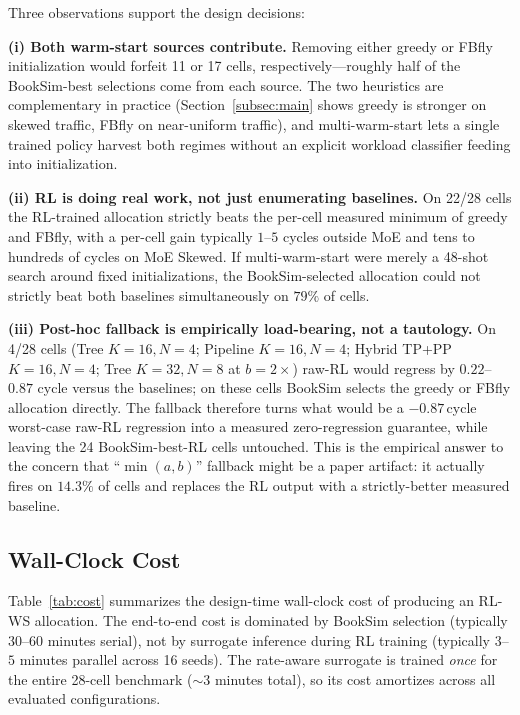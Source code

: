\documentclass[conference]{IEEEtran}
\begin{document}
Three observations support the design decisions:

\textbf{(i) Both warm-start sources contribute.} Removing either greedy or FBfly initialization would forfeit 11 or 17 cells, respectively---roughly half of the BookSim-best selections come from each source. The two heuristics are complementary in practice (Section~\ref{subsec:main} shows greedy is stronger on skewed traffic, FBfly on near-uniform traffic), and multi-warm-start lets a single trained policy harvest both regimes without an explicit workload classifier feeding into initialization.

\textbf{(ii) RL is doing real work, not just enumerating baselines.} On 22/28 cells the RL-trained allocation strictly beats the per-cell measured minimum of greedy and FBfly, with a per-cell gain typically $1$--$5$ cycles outside MoE and tens to hundreds of cycles on MoE Skewed. If multi-warm-start were merely a 48-shot search around fixed initializations, the BookSim-selected allocation could not strictly beat both baselines simultaneously on $79\%$ of cells.

\textbf{(iii) Post-hoc fallback is empirically load-bearing, not a tautology.} On 4/28 cells (Tree $K{=}16, N{=}4$; Pipeline $K{=}16, N{=}4$; Hybrid TP+PP $K{=}16, N{=}4$; Tree $K{=}32, N{=}8$ at $b{=}2\times$) raw-RL would regress by $0.22$--$0.87$ cycle versus the baselines; on these cells BookSim selects the greedy or FBfly allocation directly. The fallback therefore turns what would be a $-0.87$\,cycle worst-case raw-RL regression into a measured zero-regression guarantee, while leaving the 24 BookSim-best-RL cells untouched. This is the empirical answer to the concern that ``$\min(a,b)$'' fallback might be a paper artifact: it actually fires on $14.3\%$ of cells and replaces the RL output with a strictly-better measured baseline.

\subsection{Wall-Clock Cost}
\label{subsec:cost}

Table~\ref{tab:cost} summarizes the design-time wall-clock cost of producing an RL-WS allocation. The end-to-end cost is dominated by BookSim selection (typically $30$--$60$ minutes serial), not by surrogate inference during RL training (typically $3$--$5$ minutes parallel across 16 seeds). The rate-aware surrogate is trained \textit{once} for the entire 28-cell benchmark ($\sim$3 minutes total), so its cost amortizes across all evaluated configurations.
\end{document}
